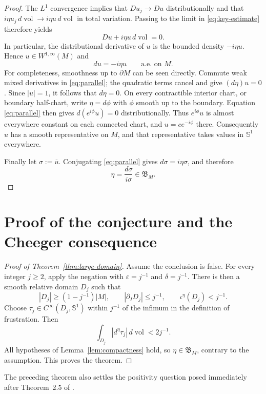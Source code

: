 \documentclass[11pt]{amsart}
\newcommand{\Sph}{\mathbb S^1}
\newcommand{\vol}{\operatorname{vol}}
\newcommand{\Bspace}{\mathfrak B}
\newcommand{\frust}{\iota}
\begin{document}
\begin{proof}
The $L^1$ convergence implies that $Du_j\to Du$ distributionally and that
$i\eta u_j\,d\vol\to i\eta u\,d\vol$ in total variation.  Passing to the
limit in \eqref{eq:key-estimate} therefore yields
\[
 Du+i\eta u\,d\vol=0.
\]
In particular, the distributional derivative of $u$ is the bounded density
$-i\eta u$.  Hence $u\in W^{1,\infty}(M)$ and
\begin{equation}
 du=-i\eta u \qquad\text{a.e. on }M.                    \label{eq:parallel}
\end{equation}
For completeness, smoothness up to $\partial M$ can be seen directly.  Commute
weak mixed derivatives in \eqref{eq:parallel}; the quadratic terms cancel and
give $(d\eta)u=0$.  Since $|u|=1$, it follows that $d\eta=0$.  On every
contractible interior chart, or boundary half-chart, write $\eta=d\phi$ with
$\phi$ smooth up to the boundary.  Equation \eqref{eq:parallel} then gives
$d(e^{i\phi}u)=0$ distributionally.  Thus $e^{i\phi}u$ is almost everywhere
constant on each connected chart, and $u=ce^{-i\phi}$ there.  Consequently
$u$ has a smooth representative on $M$, and that representative takes values
in $\Sph$ everywhere.

Finally let $\sigma:=\overline u$.  Conjugating \eqref{eq:parallel} gives
$d\sigma=i\eta\sigma$, and therefore
\[
 \eta=\frac{d\sigma}{i\sigma}\in\Bspace_M.
\]
\end{proof}

\section{Proof of the conjecture and the Cheeger consequence}

\begin{proof}[Proof of Theorem~\ref{thm:large-domain}]
Assume the conclusion is false.  For every integer $j\geq2$, apply the
negation with $\varepsilon=j^{-1}$ and $\delta=j^{-1}$.  There is then a
smooth relative domain $D_j$ such that
\[
 |D_j|\geq(1-j^{-1})|M|,
 \qquad
 |\partial_I D_j|\leq j^{-1},
 \qquad
 \frust^\eta(D_j)<j^{-1}.
\]
Choose $\tau_j\in C^\infty(D_j,\Sph)$ within $j^{-1}$ of the infimum in the
definition of frustration.  Then
\[
 \int_{D_j}|d^\eta\tau_j|\,d\vol<2j^{-1}.
\]
All hypotheses of Lemma~\ref{lem:compactness} hold, so
$\eta\in\Bspace_M$, contrary to the assumption.  This proves the theorem.
\end{proof}

The preceding theorem also settles the positivity question posed immediately
after Theorem~2.5 of \cite{CGHP}.
\end{document}
